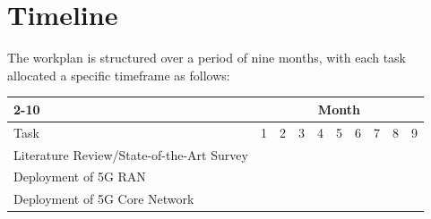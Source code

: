 \section{Timeline}
\label{sec:timeline}

The workplan is structured over a period of nine months, with each task allocated a specific timeframe as follows:
\begin{table}[!htbp]
    \centering
    \begin{tabular}{l|lllllllll|}
        \cline{2-10}
        & \multicolumn{9}{c|}{Month}                                                                                                                                                                                \\ \hline
        \multicolumn{1}{|l|}{Task}                                          & \multicolumn{1}{l|}{1}                            & \multicolumn{1}{l|}{2}                        & \multicolumn{1}{l|}{3}                      & \multicolumn{1}{l|}{4}                      & \multicolumn{1}{l|}{5}                      & \multicolumn{1}{l|}{6}                      & \multicolumn{1}{l|}{7}                        & \multicolumn{1}{l|}{8}                      & 9 \\ \hline
        \multicolumn{1}{|l|}{Literature Review/State-of-the-Art Survey}     & \multicolumn{1}{l|}{\cellcolor{blue!25}{}}        & \multicolumn{1}{l|}{\cellcolor{blue!25}{}}    & \multicolumn{1}{l|}{\cellcolor{blue!25}{}}  & \multicolumn{1}{l|}{}                       & \multicolumn{1}{l|}{}                       & \multicolumn{1}{l|}{}                       & \multicolumn{1}{l|}{}                         & \multicolumn{1}{l|}{}                       &   \\ \hline
        \multicolumn{1}{|l|}{Deployment of 5G RAN}                          & \multicolumn{1}{l|}{}                             & \multicolumn{1}{l|}{}                         & \multicolumn{1}{l|}{\cellcolor{blue!25}{}}  & \multicolumn{1}{l|}{\cellcolor{blue!25}{}}  & \multicolumn{1}{l|}{}                       & \multicolumn{1}{l|}{}                       & \multicolumn{1}{l|}{}                         & \multicolumn{1}{l|}{}                       &   \\ \hline
        \multicolumn{1}{|l|}{Deployment of 5G Core Network}                 & \multicolumn{1}{l|}{}                             & \multicolumn{1}{l|}{}                         & \multicolumn{1}{l|}{}                       & \multicolumn{1}{l|}{\cellcolor{blue!25}{}}  & \multicolumn{1}{l|}{\cellcolor{blue!25}{}}  & \multicolumn{1}{l|}{}                       & \multicolumn{1}{l|}{}                         & \multicolumn{1}{l|}{}                       &   \\ \hline

\end{tabular}
\end{table}
